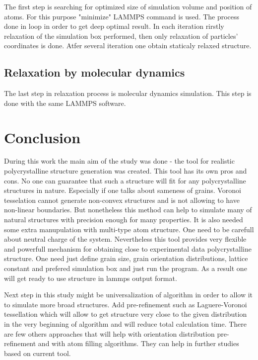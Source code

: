 \documentclass[12pt]{report}
\begin{document}
The first step is searching for optimized size of simulation volume and position of atoms. For this purpose "minimize" LAMMPS command is used. The process done in loop in order to get deep optimal result. In each iteration rirstly relaxation of the simulation box performed, then only relaxation of particles' coordinates is done. Atfer several iteration one obtain staticaly relaxed structure.

\subsection{Relaxation by molecular dynamics}

The last step in relaxation process is molecular dynamics simulation. This step is done with the same LAMMPS software. 

\section{Conclusion}

During this work the main aim of the study was done - the tool for realistic polycrystalline structure generation was created. This tool has its own pros and cons. No one can guarantee that such a structure will fit for any polycrystalline structures in nature. Especially if one talks about sameness of grains. Voronoi tesselation cannot generate non-convex structures and is not allowing to have non-linear boundaries. But nonetheless this method can help to simulate many of natural structures with precision enough for many properties. It is also needed some extra manupulation with multi-type atom structure. One need to be carefull about neutral charge of the system. Nevertheless this tool provides very flexible and powerfull mechanism for obtaining close to experimental data polycrystalline structure. One need just define grain size, grain orientation distributions, lattice constant and prefered simulation box and just run the program. As a result one will get ready to use structure in lammps output format.

Next step in this study might be universalization of algorithm in order to allow it to simulate more broad structures. Add pre-refinement such as Laguere-Voronoi tessellation which will allow to get structure very close to the given distribution in the very beginning of algorithm and will reduce total calculation time. There are few others approaches that will help with orientation distribution pre-refinement and with atom filling algorithms. They can help in further studies based on current tool.
\end{document}
